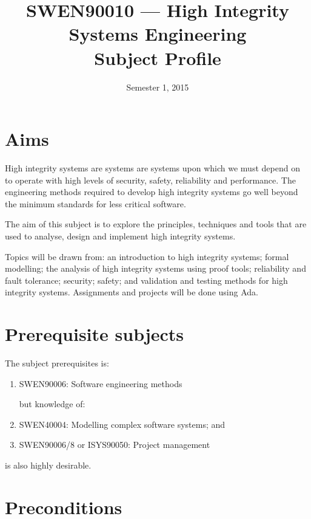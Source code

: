 \documentclass{article}
\title{SWEN90010 --- High Integrity Systems Engineering\\
 Subject Profile}
\date{Semester 1, 2015}
\begin{document}
\maketitle


\section*{Aims}

High integrity systems are systems are systems upon which we must depend on to operate with high levels of security, safety, reliability and performance. The engineering methods required to develop high integrity systems go well beyond the minimum standards for less critical software.  

The aim of this subject is to explore the principles, techniques and tools that are used to analyse, design and implement high integrity
systems.

Topics will be drawn from: an introduction to high integrity systems; formal modelling; the analysis of high integrity systems using proof tools; reliability and fault tolerance; security; safety; and validation and testing methods for high integrity systems. Assignments and projects will be done using Ada.


\section*{Prerequisite subjects}

The subject prerequisites is:

\begin{enumerate}

 \item SWEN90006: Software engineering methods

\hspace{-10mm} \noindent but knowledge of:

 \item SWEN40004: Modelling complex software systems; and

 \item SWEN90006/8 or ISYS90050: Project management

\end{enumerate}

\noindent is also highly desirable. 

\section*{Preconditions}
\end{document}
